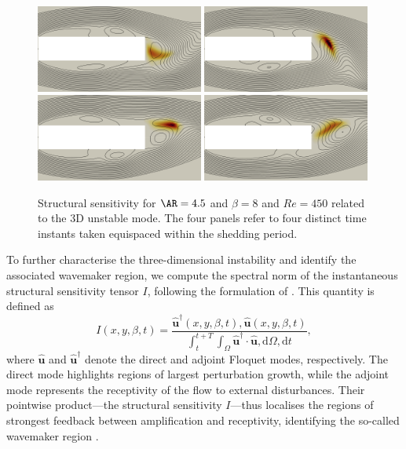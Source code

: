 \begin{figure}
  \centering
  \includegraphics[width=0.49\textwidth]{./fig/AR4p5/sens3D_25.png}
  \includegraphics[width=0.49\textwidth]{./fig/AR4p5/sens3D_50.png}
  \includegraphics[width=0.49\textwidth]{./fig/AR4p5/sens3D_75.png}
  \includegraphics[width=0.49\textwidth]{./fig/AR4p5/sens3D_100.png}
  \caption{Structural sensitivity for $\AR=4.5$ and $\beta=8$ and $Re=450$ related to the 3D unstable mode. The four panels refer to four distinct time instants taken equispaced within the shedding period.}
  \label{fig:ss3d}
\end{figure}

To further characterise the three-dimensional instability and identify the associated wavemaker region, we compute the spectral norm of the instantaneous structural sensitivity tensor $I$, following the formulation of \cite{giannetti-camarri-luchini-2010}. This quantity is defined as
\begin{equation}
I(x, y, \beta, t) = \frac{ \hat{\bm{u}}^\dagger(x, y, \beta, t), \hat{\bm{u}}(x, y, \beta, t) }{ \int_t^{t+T} \int_{\Omega} \hat{\bm{u}}^\dagger \cdot \hat{\bm{u}}, \mathrm{d}\Omega, \mathrm{d}t },
\end{equation}
where $\hat{\bm{u}}$ and $\hat{\bm{u}}^\dagger$ denote the direct and adjoint Floquet modes, respectively. The direct mode highlights regions of largest perturbation growth, while the adjoint mode represents the receptivity of the flow to external disturbances. Their pointwise product---the structural sensitivity $I$---thus localises the regions of strongest feedback between amplification and receptivity, identifying the so-called wavemaker region \citep{monkewitz-huerre-chomaz-1993}.

